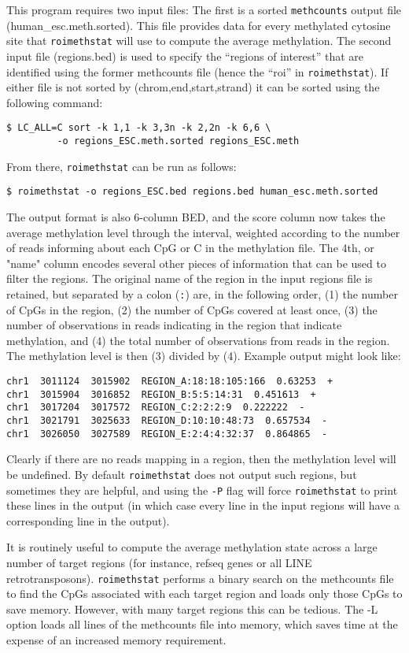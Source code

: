 \documentclass[10pt]{article}
\newcommand{\prog}[1]{\texttt{#1}}
\newcommand{\lit}[1]{\texttt{#1}}
\newcommand{\op}[1]{\texttt{#1}}
\begin{document}
{{This program requires two input files: The first is a sorted \prog{methcounts}
output file (human\_esc.meth.sorted). This file provides data for every
methylated cytosine site that \prog{roimethstat} will use to compute the
average methylation. The second input file (regions.bed) is used to specify
the ``regions of interest'' that are identified using the former methcounts
file (hence the ``roi'' in \prog{roimethstat}).
If either file is not sorted by (chrom,end,start,strand) it can be sorted using
the following command:
\begin{verbatim}
$ LC_ALL=C sort -k 1,1 -k 3,3n -k 2,2n -k 6,6 \
         -o regions_ESC.meth.sorted regions_ESC.meth
\end{verbatim}
From there, \prog{roimethstat} can be run as follows:
\begin{verbatim}
$ roimethstat -o regions_ESC.bed regions.bed human_esc.meth.sorted
\end{verbatim}
The output format is also 6-column BED, and the score column now takes
the average methylation level through the interval, weighted according
to the number of reads informing about each CpG or C in the
methylation file. The 4th, or "name" column encodes several other
pieces of information that can be used to filter the regions. The
original name of the region in the input regions file is retained, but
separated by a colon (\lit{:}) are, in the following order, (1) the
number of CpGs in the region, (2) the number of CpGs covered at least
once, (3) the number of observations in reads indicating in the region
that indicate methylation, and (4) the total number of observations
from reads in the region. The methylation level is then (3) divided by
(4). Example output might look like:
\begin{verbatim}
chr1  3011124  3015902  REGION_A:18:18:105:166  0.63253  +
chr1  3015904  3016852  REGION_B:5:5:14:31  0.451613  +
chr1  3017204  3017572  REGION_C:2:2:2:9  0.222222  -
chr1  3021791  3025633  REGION_D:10:10:48:73  0.657534  -
chr1  3026050  3027589  REGION_E:2:4:4:32:37  0.864865  -
\end{verbatim}
Clearly if there are no reads mapping in a region, then the
methylation level will be undefined. By default \prog{roimethstat}
does not output such regions, but sometimes they are helpful, and
using the \op{-P} flag will force \prog{roimethstat} to print these
lines in the output (in which case every line in the input regions
will have a corresponding line in the output).

It is routinely useful to compute the average methylation state across a
large number of target regions (for instance, refseq genes or all LINE
retrotransposons). \prog{roimethstat} performs a binary search on the
methcounts file to find the CpGs associated with each target region and
loads only those CpGs to save memory. However, with many target regions
this can be tedious. The -L option loads all lines of the methcounts
file into memory, which saves time at the expense of an increased
memory requirement.

}}
\end{document}
